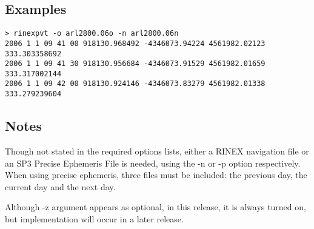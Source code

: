 \subsection{Examples}
\begin{\outputsize}
\begin{verbatim}
> rinexpvt -o arl2800.06o -n arl2800.06n
2006 1 1 09 41 00 918130.968492 -4346073.94224 4561982.02123 333.303358692
2006 1 1 09 41 30 918130.956684 -4346073.91529 4561982.01659 333.317002144
2006 1 1 09 42 00 918130.924146 -4346073.83279 4561982.01338 333.279239604
\end{verbatim}
\end{\outputsize}
\subsection{Notes}
Though not stated in the required options lists, either a RINEX navigation file or an SP3 Precise Ephemeris File is needed, using the -n or -p option respectively. When using precise ephemeris, three files must be included: the previous day, the current day and the next day. 

Although -z argument appears as optional, in this release, it is always turned on, but implementation will occur in a later release.
%


